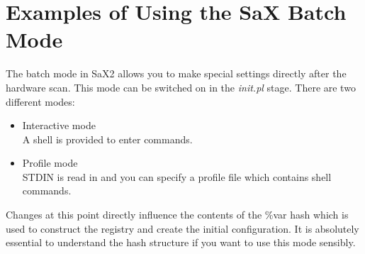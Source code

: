 \chapter{Examples of Using the SaX Batch Mode}
\minitoc

The batch mode in SaX2 allows you to make special settings directly after the 
hardware scan. This mode can be switched on in the \textit{init.pl}
stage. There are two different modes:\\
\begin{itemize}
\item Interactive mode\\
      A shell is provided to enter commands.
\item Profile mode\\
      STDIN is read in and you can specify a profile file which contains shell
      commands.
\end{itemize}
Changes at this point directly influence the contents of the 
\%var hash which is used to construct the registry and create the initial
configuration. It is absolutely essential to understand the hash structure if
you want to use this mode sensibly. 

